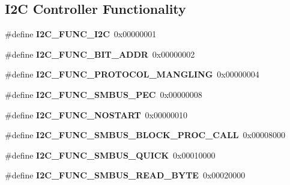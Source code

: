 \subsection*{I2C Controller Functionality}
\begin{DoxyCompactItemize}
\item 
\mbox{\label{group__I2CLinux_ga57a8a5a73f12268825d31bec6184b915}} 
\#define {\bfseries I2\+C\+\_\+\+F\+U\+N\+C\+\_\+\+I2C}~0x00000001
\item 
\mbox{\label{group__I2CLinux_ga41ba50f5508feed338fe3181540e1894}} 
\#define {\bfseries I2\+C\+\_\+\+F\+U\+N\+C\+\_\+B\+I\+T\+\_\+\+A\+D\+DR}~0x00000002
\item 
\mbox{\label{group__I2CLinux_gaf023c6b90cc950f3673e98462ff52a59}} 
\#define {\bfseries I2\+C\+\_\+\+F\+U\+N\+C\+\_\+\+P\+R\+O\+T\+O\+C\+O\+L\+\_\+\+M\+A\+N\+G\+L\+I\+NG}~0x00000004
\item 
\mbox{\label{group__I2CLinux_gaef3b905e021dbe7aaf98da89c4648764}} 
\#define {\bfseries I2\+C\+\_\+\+F\+U\+N\+C\+\_\+\+S\+M\+B\+U\+S\+\_\+\+P\+EC}~0x00000008
\item 
\mbox{\label{group__I2CLinux_gad9d706204e5843833e2e0e0a297f6bfd}} 
\#define {\bfseries I2\+C\+\_\+\+F\+U\+N\+C\+\_\+\+N\+O\+S\+T\+A\+RT}~0x00000010
\item 
\mbox{\label{group__I2CLinux_gab98217e0ad04cb3068e159c2de8fd84d}} 
\#define {\bfseries I2\+C\+\_\+\+F\+U\+N\+C\+\_\+\+S\+M\+B\+U\+S\+\_\+\+B\+L\+O\+C\+K\+\_\+\+P\+R\+O\+C\+\_\+\+C\+A\+LL}~0x00008000
\item 
\mbox{\label{group__I2CLinux_ga4cf424f52753c3afe4ee9713c96358a2}} 
\#define {\bfseries I2\+C\+\_\+\+F\+U\+N\+C\+\_\+\+S\+M\+B\+U\+S\+\_\+\+Q\+U\+I\+CK}~0x00010000
\item 
\mbox{\label{group__I2CLinux_ga2aea3a65daa2b1734e85d5c63b9e9672}} 
\#define {\bfseries I2\+C\+\_\+\+F\+U\+N\+C\+\_\+\+S\+M\+B\+U\+S\+\_\+\+R\+E\+A\+D\+\_\+\+B\+Y\+TE}~0x00020000
\item 
\mbox{\label{group__I2CLinux_ga0a0e43b21d3085e3a00300f41ccf156d}} 

\end{DoxyCompactItemize}
